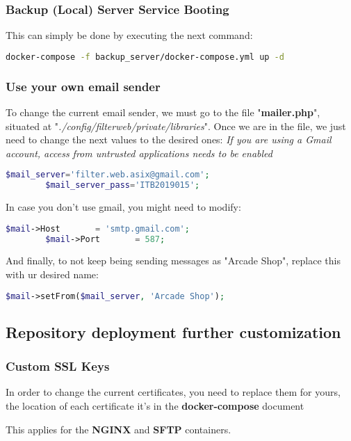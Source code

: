 \subsubsection[Backup (Local) Server Service Booting]{Backup (Local) Server Service Booting}
This can simply be done by executing the next command:
\begin{lstlisting}[language=bash,label={lst:compose-up-bk-Local}]
docker-compose -f backup_server/docker-compose.yml up -d\end{lstlisting}


\subsubsection[Use your own email sender]{Use your own email sender}
\begin{flushleft}
    To change the current email sender, we must go to the file "\textbf{mailer.php}", situated at "\textit{./config/filterweb/private/libraries}".
    Once we are in the file, we just need to change the next values to the desired ones:
    \textit{If you are using a Gmail account, access from untrusted applications needs to be enabled}
    \begin{lstlisting}[language=php,label={lst:mail_accounts}]
        $mail_server='filter.web.asix@gmail.com';
        $mail_server_pass='ITB2019015';\end{lstlisting}
    In case you don't use gmail, you might need to modify:
    \begin{lstlisting}[language=php,label={lst:mail_accounts2}]
        $mail->Host       = 'smtp.gmail.com';
        $mail->Port       = 587;\end{lstlisting}
    And finally, to not keep being sending messages as "Arcade Shop", replace this with ur desired name:
    \begin{lstlisting}[language=php,label={lst:mail_accounts3}]
        $mail->setFrom($mail_server, 'Arcade Shop');\end{lstlisting}
\end{flushleft}


\newpage
\subsection{Repository deployment further customization}\label{subsec:repository-deployment-further-customization}
\subsubsection[Custom SSL Keys]{Custom SSL Keys}
\begin{flushleft}
    In order to change the current certificates, you need to replace them for yours, the location of each certificate
    it's in the \textbf{docker-compose} document

    This applies for the \textbf{NGINX} and \textbf{SFTP} containers.
\end{flushleft}

